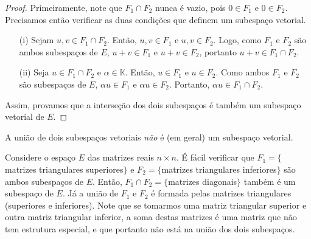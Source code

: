 \begin{proof}
Primeiramente, note que $F_1\cap F_2$ nunca é vazio, pois $0\in F_1$ e $0\in F_2$. Precisamos então verificar as duas condições que definem um subespaço vetorial.
\begin{itemize}
\item[(i)] Sejam $u,v \in F_1\cap F_2$. Então, $u,v \in F_1$ e $u,v\in F_2$. Logo, como $F_1$ e $F_2$ são ambos subespaços de $E$, $u+v\in F_1$ e $u+v \in F_2$, portanto $u+v\in F_1 \cap F_2$.
\item[(ii)] Seja $u\in F_1\cap F_2$ e $\alpha \in {\mathbb{K}}$. Então, $u\in F_1$ e $u\in F_2$. Como ambos $F_1$ e $F_2$ são subespaços de $E$, $\alpha u \in F_1$ e $\alpha u \in F_2$. Portanto, $\alpha u \in F_1 \cap F_2$.
\end{itemize}
Assim, provamos que a interseção dos dois subespaços é também um subespaço vetorial de $E$.
\end{proof}

A união de dois subespaços vetoriais \emph{não} é (em geral) um subespaço vetorial. 

\begin{exemplo}
  Considere o espaço $E$ das matrizes reais $n\times n$. É fácil verificar que $F_1= \{$matrizes triangulares superiores$\}$ e $F_2= \{$matrizes triangulares inferiores$\}$ são ambos subespaços de $E$. Então, $F_1\cap F_2 = \{$matrizes diagonais$\}$ também é um subespaço de $E$. Já a união de $F_1$ e $F_2$ é formada pelas matrizes triangulares (superiores e inferiores). Note que se tomarmos uma matriz triangular superior e outra matriz triangular inferior, a soma destas matrizes é uma matriz que não tem estrutura especial, e que portanto não está na união dos dois subespaços.
\end{exemplo}

